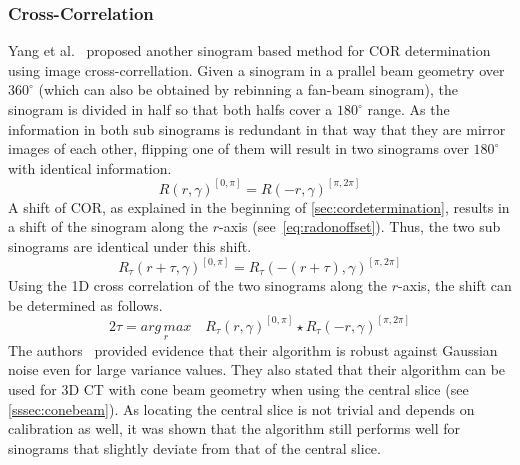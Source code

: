 \documentclass[10pt,journal,compsoc]{IEEEtran}
\begin{document}
\subsubsection{Cross-Correlation}\label{sssec:crosscorrelation}
Yang et al.~\cite{Yang2011} proposed another sinogram based method for COR determination using image cross-correllation.
Given a sinogram in a prallel beam geometry over $360^\circ$ (which can also be obtained by rebinning a fan-beam sinogram), the sinogram is divided in half so that both halfs cover a $180^\circ$ range.
As the information in both sub sinograms is redundant in that way that they are mirror images of each other,
flipping one of them will result in two sinograms over $180^\circ$ with identical information.
%
\begin{equation}
R(r,\gamma)^{[0,\pi]} = R(-r,\gamma)^{[\pi,2\pi]}
\end{equation}
%
A shift of COR, as explained in the beginning of \cref{sec:cordetermination}, results in a shift of the sinogram along the $r$-axis (see~\cref{eq:radonoffset}).
Thus, the two sub sinograms are identical under this shift.
%
\begin{equation}
R_\tau(r+\tau,\gamma)^{[0,\pi]} = R_\tau(-(r+\tau),\gamma)^{[\pi,2\pi]}
\end{equation}
%
Using the 1D cross correlation of the two sinograms along the $r$-axis, the shift can be determined as follows.
%
\begin{equation}
2\tau = \underset{r}{arg\,max}\quad R_\tau(r,\gamma)^{[0,\pi]} \star R_\tau(-r,\gamma)^{[\pi,2\pi]}
\end{equation}
%
The authors~\cite{Yang2011} provided evidence that their algorithm is robust against Gaussian noise even for large variance values.
They also stated that their algorithm can be used for 3D CT with cone beam geometry when using the central slice (see \cref{sssec:conebeam}).
As locating the central slice is not trivial and depends on calibration as well, it was shown that the algorithm still performs well for sinograms that slightly deviate from that of the central slice. 
\end{document}
